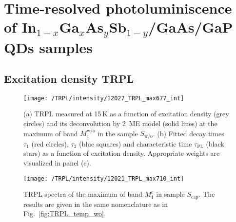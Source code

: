 \chapter{Time-resolved photoluminiscence of In$_{1-x}$Ga$_{x}$As$_y$Sb$_{1-y}$/GaAs/GaP QDs samples}

\section{Excitation density TRPL}
\label{chapter:appendix_TRPL_int}
\begin{figure}
	\centering
	\texttt{[image: /TRPL/intensity/12027\_TRPL\_max677\_int]}
	\caption{(a) TRPL measured at 15$\,$K as a function of excitation density (grey circles) and its deconvolution by 2~ME model (solid lines) at the maximum of band $M_1^\mathrm{w/o}$ in the sample $S_\mathrm{w/o}$. (b) Fitted decay times $\tau_1$ (red circles), $\tau_2$ (blue squares) and characteristic time $\tau_\mathrm{PL}$ (black stars) as a function of excitation density. Appropriate weights are visualized in panel (c).}
\end{figure}


\begin{figure}
	\centering
	\texttt{[image: /TRPL/intensity/12021\_TRPL\_max710\_int]}
	\caption{TRPL spectra of the maximum of band $M_1^\mathrm{c}$ in sample $S_\mathrm{cap}$. The results are given in the same nomenclature as in Fig.~\ref{fig:TRPL_temp_wo}.}
\end{figure}
\newpage 